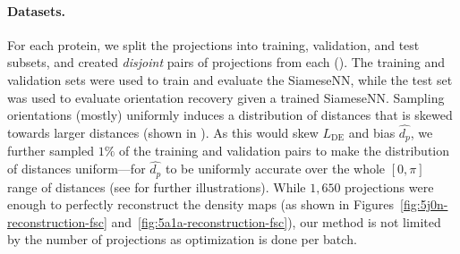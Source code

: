 \paragraph{Datasets.}
For each protein, we split the projections into training, validation, and test subsets, and created \textit{disjoint} pairs of projections from each ().
The training and validation sets were used to train and evaluate the SiameseNN, while the test set was used to evaluate orientation recovery given a trained SiameseNN\@.
Sampling orientations (mostly) uniformly induces a distribution of distances that is skewed towards larger distances (shown in ).
As this would skew $L_\text{DE}$ and bias $\widehat{d_p}$, we further sampled $1\%$ of the training and validation pairs to make the distribution of distances uniform---for $\widehat{d_p}$ to be uniformly accurate over the whole $[0,\pi]$ range of distances
(see  for further illustrations).
While $1,650$ projections were enough to perfectly reconstruct the density maps (as shown in Figures~\ref{fig:5j0n-reconstruction-fsc} and~\ref{fig:5a1a-reconstruction-fsc}), our method is not limited by the number of projections as optimization is done per batch.

